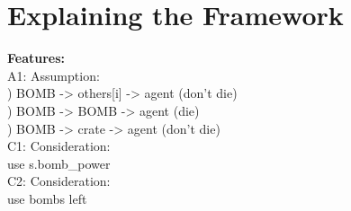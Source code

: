 \documentclass[a4paper]{article}
\begin{document}
\section{Explaining the Framework}
\newpage
\noindent \Large \textbf{Features:}  \normalsize \\
A1: Assumption: \\
) BOMB  -> others[i] ->  agent     (don't die) \\
) BOMB -> BOMB -> agent           (die) \\
) BOMB -> crate -> agent 		(don't die) \\

\noindent C1: Consideration: \\
\indent use s.bomb\_power \\
\noindent C2: Consideration: \\
\indent use bombs left\\
\end{document}
